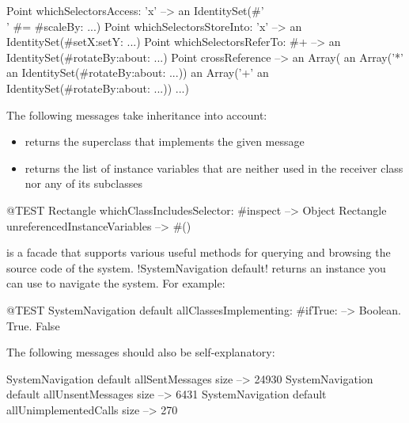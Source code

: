 \documentclass[a4paper,10pt,twoside]{book}
\begin{document}
\begin{code}{} %
Point whichSelectorsAccess: 'x'    --> an IdentitySet(#'\\' #= #scaleBy: ...)
Point whichSelectorsStoreInto: 'x' --> an IdentitySet(#setX:setY: ...)
Point whichSelectorsReferTo: #+  --> an IdentitySet(#rotateBy:about: ...)
Point crossReference --> an Array(
		an Array('*' an IdentitySet(#rotateBy:about: ...))
		an Array('+' an IdentitySet(#rotateBy:about: ...))
		...)
\end{code}

The following messages take inheritance into account:
\begin{itemize}
\item {} returns the superclass that implements the given message
\item {} returns the list of instance variables that are neither used in the receiver class nor any of its subclasses
\end{itemize}

\begin{code}{@TEST}
Rectangle whichClassIncludesSelector: #inspect --> Object
Rectangle unreferencedInstanceVariables            --> #()
\end{code}

 is a facade that supports various useful methods for querying and browsing the source code of the system.
\ct!SystemNavigation default! returns an instance you can use to navigate the system.
For example:

\begin{code}{@TEST}
SystemNavigation default allClassesImplementing: #ifTrue: --> {Boolean. True. False}
\end{code}


The following messages should also be self-explanatory:

\begin{code}{}
SystemNavigation default allSentMessages size          --> 24930
SystemNavigation default allUnsentMessages size      --> 6431
SystemNavigation default allUnimplementedCalls size --> 270
\end{code}
\end{document}
